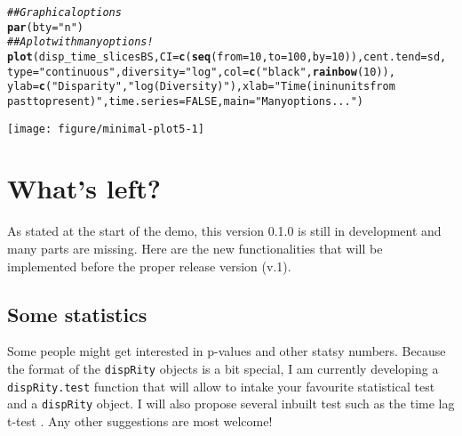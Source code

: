 \documentclass{article}\usepackage[]{graphicx}\usepackage[]{color}
\makeatletter
\newcommand{\hlnum}[1]{\textcolor[rgb]{0.686,0.059,0.569}{#1}}%
\newcommand{\hlstr}[1]{\textcolor[rgb]{0.192,0.494,0.8}{#1}}%
\newcommand{\hlcom}[1]{\textcolor[rgb]{0.678,0.584,0.686}{\textit{#1}}}%
\newcommand{\hlstd}[1]{\textcolor[rgb]{0.345,0.345,0.345}{#1}}%
\newcommand{\hlkwc}[1]{\textcolor[rgb]{0.333,0.667,0.333}{#1}}%
\newcommand{\hlkwd}[1]{\textcolor[rgb]{0.737,0.353,0.396}{\textbf{#1}}}%
\newenvironment{kframe}{%
 \def\at@end@of@kframe{}%
 \ifinner\ifhmode%
  \def\at@end@of@kframe{\end{minipage}}%
  \begin{minipage}{\columnwidth}%
 \fi\fi%
 \def\FrameCommand##1{\hskip\@totalleftmargin \hskip-\fboxsep
 \colorbox{shadecolor}{##1}\hskip-\fboxsep
     \hskip-\linewidth \hskip-\@totalleftmargin \hskip\columnwidth}%
 \MakeFramed {\advance\hsize-\width
   \@totalleftmargin\z@ \linewidth\hsize
   \@setminipage}}%
 {\par\unskip\endMakeFramed%
 \at@end@of@kframe}
\newenvironment{knitrout}{}{} %
\newcommand{\dispRity}{\texttt{dispRity} }
\makeatother
\begin{document}
\begin{knitrout}
\color{fgcolor}\begin{kframe}
\begin{alltt}
\hlcom{## Graphical options}
\hlkwd{par}\hlstd{(}\hlkwc{bty} \hlstd{=} \hlstr{"n"}\hlstd{)}
\hlcom{## A plot with many options!}
\hlkwd{plot}\hlstd{(disp_time_slicesBS,} \hlkwc{CI} \hlstd{=} \hlkwd{c}\hlstd{(}\hlkwd{seq}\hlstd{(}\hlkwc{from}\hlstd{=}\hlnum{10}\hlstd{,} \hlkwc{to}\hlstd{=}\hlnum{100}\hlstd{,} \hlkwc{by}\hlstd{=}\hlnum{10}\hlstd{)),} \hlkwc{cent.tend} \hlstd{= sd,}
    \hlkwc{type} \hlstd{=} \hlstr{"continuous"}\hlstd{,} \hlkwc{diversity} \hlstd{=} \hlstr{"log"}\hlstd{,} \hlkwc{col} \hlstd{=} \hlkwd{c}\hlstd{(}\hlstr{"black"}\hlstd{,} \hlkwd{rainbow}\hlstd{(}\hlnum{10}\hlstd{)),}
    \hlkwc{ylab} \hlstd{=} \hlkwd{c}\hlstd{(}\hlstr{"Disparity"}\hlstd{,} \hlstr{"log(Diversity)"}\hlstd{),} \hlkwc{xlab} \hlstd{=} \hlstr{"Time (in in units from
    past to present)"}\hlstd{,} \hlkwc{time.series} \hlstd{=} \hlnum{FALSE}\hlstd{,} \hlkwc{main} \hlstd{=} \hlstr{"Many options..."}\hlstd{)}
\end{alltt}
\end{kframe}

{\centering \texttt{[image: figure/minimal-plot5-1]} 

}



\end{knitrout}

\section{What's left?}
\label{whatsleft}
As stated at the start of the demo, this version 0.1.0 is still in development and many parts are missing.
Here are the new functionalities that will be implemented before the proper release version (v.1).

\subsection{Some statistics}
Some people might get interested in p-values and other statsy numbers.
Because the format of the \dispRity objects is a bit special, I am currently developing a \texttt{dispRity.test} function that will allow to intake your favourite statistical test and a \dispRity object.
I will also propose several inbuilt test such as the time lag t-test \cite{GuillermeSTD}.
Any other suggestions are most welcome!
\end{document}
